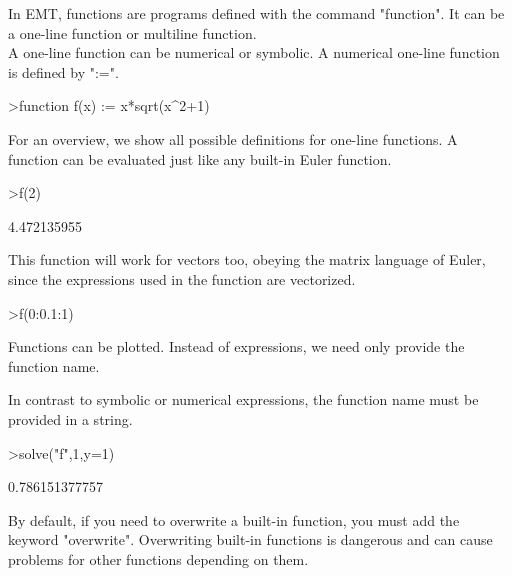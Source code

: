 \documentclass{article}
\begin{document}
\begin{eulernotebook}
\begin{eulercomment}
\begin{eulercomment}
\begin{eulerprompt}
\end{eulerprompt}
\begin{eulercomment}
In EMT, functions are programs defined with the command "function". It can be a
one-line function or multiline function.\\
A one-line function can be numerical or symbolic. A numerical one-line function is
defined by ":=".
\end{eulercomment}
\begin{eulerprompt}
>function f(x) := x*sqrt(x^2+1)
\end{eulerprompt}
\begin{eulercomment}
For an overview, we show all possible definitions for one-line functions. A
function can be evaluated just like any built-in Euler function.
\end{eulercomment}
\begin{eulerprompt}
>f(2)
\end{eulerprompt}
\begin{euleroutput}
  4.472135955
\end{euleroutput}
\begin{eulercomment}
This function will work for vectors too, obeying the matrix language of
Euler, since the expressions used in the function are vectorized.
\end{eulercomment}
\begin{eulerprompt}
>f(0:0.1:1)
\end{eulerprompt}
\begin{euleroutput}
  [0,  0.100499,  0.203961,  0.313209,  0.430813,  0.559017,  0.699714,
  0.854459,  1.0245,  1.21083,  1.41421]
\end{euleroutput}
\begin{eulercomment}
Functions can be plotted. Instead of expressions, we need only provide the
function name.

In contrast to symbolic or numerical expressions, the function name must be
provided in a string.
\end{eulercomment}
\begin{eulerprompt}
>solve("f",1,y=1)
\end{eulerprompt}
\begin{euleroutput}
  0.786151377757
\end{euleroutput}
\begin{eulercomment}
By default, if you need to overwrite a built-in function, you must add the
keyword "overwrite". Overwriting built-in functions is dangerous and can
cause problems for other functions depending on them.


\end{eulercomment}
\end{eulercomment}
\end{eulercomment}
\end{eulernotebook}
\end{document}
